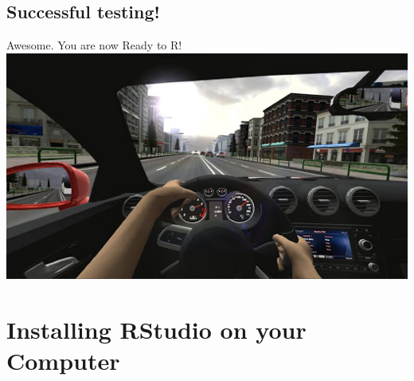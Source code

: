 \documentclass[
]{book}
\begin{document}
\hypertarget{successful-testing}{%
\subsection{Successful testing!}\label{successful-testing}}

Awesome. You are now Ready to R!
\includegraphics{images/ready2R.png}

\hypertarget{installing-rstudio-on-your-computer}{%
\section{Installing RStudio on your Computer}\label{installing-rstudio-on-your-computer}}
\end{document}

